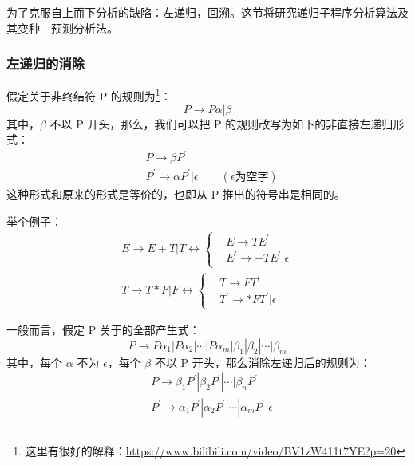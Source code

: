 为了克服自上而下分析的缺陷：左递归，回溯。这节将研究递归子程序分析算法及其变种—预测分析法。

\subsubsection{左递归的消除}

假定关于非终结符 P 的规则为\footnote{这里有很好的解释：\url{https://www.bilibili.com/video/BV1zW411t7YE?p=20}}：
\[ P \rightarrow P\alpha|\beta \]
其中，$\beta$ 不以 P 开头，那么，我们可以把 P 的规则改写为如下的非直接左递归形式：
\begin{equation}
    \begin{aligned}
        &P \rightarrow \beta P^{'} \\
        &P^{'} \rightarrow \alpha P^{'} | \epsilon \qquad (\epsilon \text{为空字})  \nonumber
    \end{aligned}
\end{equation}
这种形式和原来的形式是等价的，也即从 P 推出的符号串是相同的。

举个例子：
\begin{equation}
    \begin{aligned}
        E \rightarrow E+T|T \longleftrightarrow 
        \left\{
            \begin{aligned}
                &E \rightarrow TE^{'} \\
                &E^{'} \rightarrow +TE^{'}|\epsilon 
            \end{aligned} 
        \right. \\
        T \rightarrow T*F|F \longleftrightarrow
        \left\{
            \begin{aligned}
                &T \rightarrow FT^{'} \\
                &T^{'} \rightarrow *FT^{'}|\epsilon 
            \end{aligned} 
        \right. \nonumber
    \end{aligned}
\end{equation}

一般而言，假定 P 关于的全部产生式：
\[ P \rightarrow P\alpha_1 | P\alpha_2 | \cdots | P\alpha_m | \beta_1 | \beta_2 | \cdots | \beta_m \]
其中，每个 $\alpha$ 不为 $\epsilon$，每个 $\beta$ 不以 P 开头，那么消除左递归后的规则为：
\begin{equation}
    \begin{aligned}
        &P \rightarrow \beta_1P^{'} | \beta_2P^{'} | \cdots | \beta_nP^{'} \\
        &P^{'} \rightarrow \alpha_1P^{'} | \alpha_2P^{'} | \cdots | \alpha_mP^{'} | \epsilon \nonumber
    \end{aligned}
\end{equation}

